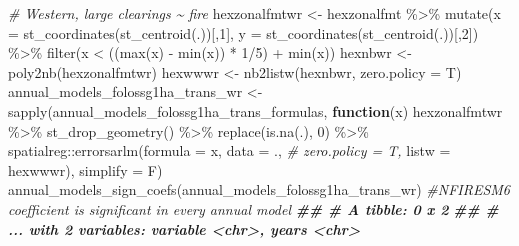 \documentclass[10pt,landscape,a3paper]{article}
\newenvironment{Shaded}{\begin{snugshade}}{\end{snugshade}}
\newcommand{\AttributeTok}[1]{\textcolor[rgb]{0.77,0.63,0.00}{#1}}
\newcommand{\CommentTok}[1]{\textcolor[rgb]{0.56,0.35,0.01}{\textit{#1}}}
\newcommand{\ControlFlowTok}[1]{\textcolor[rgb]{0.13,0.29,0.53}{\textbf{#1}}}
\newcommand{\DecValTok}[1]{\textcolor[rgb]{0.00,0.00,0.81}{#1}}
\newcommand{\DocumentationTok}[1]{\textcolor[rgb]{0.56,0.35,0.01}{\textbf{\textit{#1}}}}
\newcommand{\FunctionTok}[1]{\textcolor[rgb]{0.00,0.00,0.00}{#1}}
\newcommand{\NormalTok}[1]{#1}
\newcommand{\OtherTok}[1]{\textcolor[rgb]{0.56,0.35,0.01}{#1}}
\newcommand{\SpecialCharTok}[1]{\textcolor[rgb]{0.00,0.00,0.00}{#1}}
\begin{document}
\begin{Shaded}
\begin{Highlighting}[]
\CommentTok{\# Western, large clearings \textasciitilde{} fire}
\NormalTok{hexzonalfmtwr }\OtherTok{\textless{}{-}}\NormalTok{ hexzonalfmt }\SpecialCharTok{\%\textgreater{}\%}
  \FunctionTok{mutate}\NormalTok{(}\AttributeTok{x =} \FunctionTok{st\_coordinates}\NormalTok{(}\FunctionTok{st\_centroid}\NormalTok{(.))[,}\DecValTok{1}\NormalTok{], }\AttributeTok{y =} \FunctionTok{st\_coordinates}\NormalTok{(}\FunctionTok{st\_centroid}\NormalTok{(.))[,}\DecValTok{2}\NormalTok{]) }\SpecialCharTok{\%\textgreater{}\%}
  \FunctionTok{filter}\NormalTok{(x }\SpecialCharTok{\textless{}}\NormalTok{ ((}\FunctionTok{max}\NormalTok{(x) }\SpecialCharTok{{-}} \FunctionTok{min}\NormalTok{(x)) }\SpecialCharTok{*} \DecValTok{1}\SpecialCharTok{/}\DecValTok{5}\NormalTok{) }\SpecialCharTok{+} \FunctionTok{min}\NormalTok{(x))}
\NormalTok{hexnbwr }\OtherTok{\textless{}{-}} \FunctionTok{poly2nb}\NormalTok{(hexzonalfmtwr)}
\NormalTok{hexwwwr }\OtherTok{\textless{}{-}} \FunctionTok{nb2listw}\NormalTok{(hexnbwr, }\AttributeTok{zero.policy =}\NormalTok{ T)}
\NormalTok{annual\_models\_folossg1ha\_trans\_wr }\OtherTok{\textless{}{-}} \FunctionTok{sapply}\NormalTok{(annual\_models\_folossg1ha\_trans\_formulas,}
                        \ControlFlowTok{function}\NormalTok{(x)}
\NormalTok{                          hexzonalfmtwr }\SpecialCharTok{\%\textgreater{}\%}
                          \FunctionTok{st\_drop\_geometry}\NormalTok{() }\SpecialCharTok{\%\textgreater{}\%}
                          \FunctionTok{replace}\NormalTok{(}\FunctionTok{is.na}\NormalTok{(.), }\DecValTok{0}\NormalTok{) }\SpecialCharTok{\%\textgreater{}\%}
\NormalTok{                          spatialreg}\SpecialCharTok{::}\FunctionTok{errorsarlm}\NormalTok{(}\AttributeTok{formula =}\NormalTok{ x,}
                                                 \AttributeTok{data =}\NormalTok{ ., }\CommentTok{\# zero.policy = T,}
                                                 \AttributeTok{listw =}\NormalTok{ hexwwwr),}
                        \AttributeTok{simplify =}\NormalTok{ F)}
\FunctionTok{annual\_models\_sign\_coefs}\NormalTok{(annual\_models\_folossg1ha\_trans\_wr) }\CommentTok{\#NFIRESM6 coefficient is significant in every annual model}
\DocumentationTok{\#\# \# A tibble: 0 x 2}
\DocumentationTok{\#\# \# ... with 2 variables: variable \textless{}chr\textgreater{}, years \textless{}chr\textgreater{}}


\end{Highlighting}
\end{Shaded}
\end{document}
